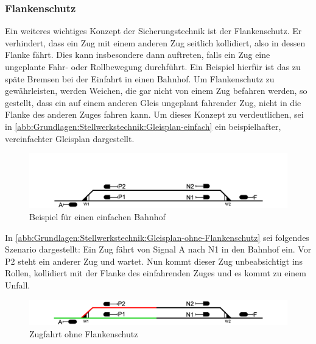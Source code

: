 \subsubsection*{Flankenschutz}\label{text:Grundlagen:Stellwerkstechnik:Sicherung-des-Schienenverkehrs:Flankenschutz}

Ein weiteres wichtiges Konzept der Sicherungstechnik ist der Flankenschutz. Er verhindert, dass ein Zug mit einem anderen Zug seitlich kollidiert, also in dessen Flanke fährt. Dies kann insbesondere dann auftreten, falls ein Zug eine ungeplante Fahr- oder Rollbewegung durchführt. Ein Beispiel hierfür ist das zu späte Bremsen bei der Einfahrt in einen Bahnhof. Um Flankenschutz zu gewährleisten, werden Weichen, die gar nicht von einem Zug befahren werden, so gestellt, dass ein auf einem anderen Gleis ungeplant fahrender Zug, nicht in die Flanke des anderen Zuges fahren kann. Um dieses Konzept zu verdeutlichen, sei in \autoref{abb:Grundlagen:Stellwerkstechnik:Gleisplan-einfach} ein beispielhafter, vereinfachter Gleisplan dargestellt.

\begin{figure}[H]
    \centering
    \includegraphics[width=\textwidth]{Assets/Images/2-Grundlagen/Gleisplan-Einfacher-Bahnhof-Nur-Gleisplan.png}
    \caption{Beispiel für einen einfachen Bahnhof}\label{abb:Grundlagen:Stellwerkstechnik:Gleisplan-einfach}
\end{figure}

In \autoref{abb:Grundlagen:Stellwerkstechnik:Gleisplan-ohne-Flankenschutz} sei folgendes Szenario dargestellt: Ein Zug fährt von Signal A nach N1 in den Bahnhof ein. Vor P2 steht ein anderer Zug und wartet. Nun kommt dieser Zug unbeabsichtigt ins Rollen, kollidiert mit der Flanke des einfahrenden Zuges und es kommt zu einem Unfall.

\begin{figure}[H]
    \centering
    \includegraphics[width=\textwidth]{Assets/Images/2-Grundlagen/Gleisplan-Einfacher-Bahnhof-Ohne-Flankenschutz.png}
    \caption{Zugfahrt ohne Flankenschutz}\label{abb:Grundlagen:Stellwerkstechnik:Gleisplan-ohne-Flankenschutz}
\end{figure}

